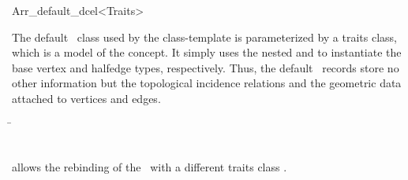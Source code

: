 
\ccRefPageBegin

\begin{ccRefClass}{Arr_default_dcel<Traits>}

\ccDefinition

The default \dcel\ class used by the  class-template
is parameterized by a traits class, which is a model of the
 concept. It simply uses the nested
 and  to instantiate
the base vertex and halfedge types, respectively. Thus, the default \dcel\
records store no other information but the topological incidence relations
and the geometric data attached to vertices and edges.


\ccIsModel

\ccInheritsFrom
  \begin{tabbing}
    \= \\
                        \>\\
                        \>\ccc{Arr_face_base>}
  \end{tabbing}

\ccTypes

   {allows the rebinding of the \dcel\ with a different traits class .}

\ccSeeAlso


\end{ccRefClass}

\ccRefPageEnd
